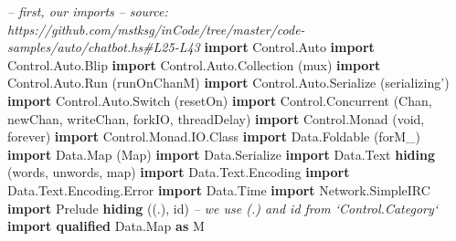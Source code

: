 \documentclass[]{article}
\newenvironment{Shaded}{}{}
\newcommand{\KeywordTok}[1]{\textcolor[rgb]{0.00,0.44,0.13}{\textbf{#1}}}
\newcommand{\DataTypeTok}[1]{\textcolor[rgb]{0.56,0.13,0.00}{#1}}
\newcommand{\CommentTok}[1]{\textcolor[rgb]{0.38,0.63,0.69}{\textit{#1}}}
\newcommand{\NormalTok}[1]{#1}
\begin{document}
\begin{Shaded}
\begin{Highlighting}[]
\CommentTok{-- first, our imports}
\CommentTok{-- source: https://github.com/mstksg/inCode/tree/master/code-samples/auto/chatbot.hs#L25-L43}
\KeywordTok{import }\DataTypeTok{Control.Auto}
\KeywordTok{import }\DataTypeTok{Control.Auto.Blip}
\KeywordTok{import }\DataTypeTok{Control.Auto.Collection}\NormalTok{  (mux)}
\KeywordTok{import }\DataTypeTok{Control.Auto.Run}\NormalTok{         (runOnChanM)}
\KeywordTok{import }\DataTypeTok{Control.Auto.Serialize}\NormalTok{   (serializing')}
\KeywordTok{import }\DataTypeTok{Control.Auto.Switch}\NormalTok{      (resetOn)}
\KeywordTok{import }\DataTypeTok{Control.Concurrent}\NormalTok{       (}\DataTypeTok{Chan}\NormalTok{, newChan, writeChan, forkIO, threadDelay)}
\KeywordTok{import }\DataTypeTok{Control.Monad}\NormalTok{            (void, forever)}
\KeywordTok{import }\DataTypeTok{Control.Monad.IO.Class}
\KeywordTok{import }\DataTypeTok{Data.Foldable}\NormalTok{            (forM_)}
\KeywordTok{import }\DataTypeTok{Data.Map}\NormalTok{                 (}\DataTypeTok{Map}\NormalTok{)}
\KeywordTok{import }\DataTypeTok{Data.Serialize}
\KeywordTok{import }\DataTypeTok{Data.Text} \KeywordTok{hiding}\NormalTok{         (words, unwords, map)}
\KeywordTok{import }\DataTypeTok{Data.Text.Encoding}
\KeywordTok{import }\DataTypeTok{Data.Text.Encoding.Error}
\KeywordTok{import }\DataTypeTok{Data.Time}
\KeywordTok{import }\DataTypeTok{Network.SimpleIRC}
\KeywordTok{import }\DataTypeTok{Prelude} \KeywordTok{hiding}\NormalTok{           ((.), id)   }\CommentTok{-- we use (.) and id from `Control.Category`}
\KeywordTok{import qualified} \DataTypeTok{Data.Map}       \KeywordTok{as} \DataTypeTok{M}
\end{Highlighting}
\end{Shaded}
\end{document}
